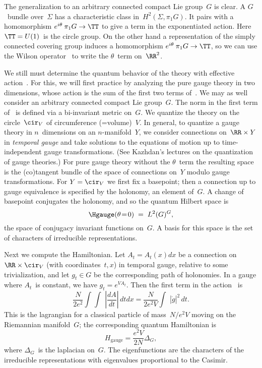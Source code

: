The generalization to an arbitrary connected compact Lie group~$G$ is clear.
A $G$~bundle over~$\Sigma $ has a characteristic class in~$H^2(\Sigma ,\pi
_1G)$.  It pairs with a homomorphism $e^{i\theta }\:\pi _1G\to\TT$ to give a
term in the exponentiated action.  Here $\TT=U(1)$~is the circle group.  On
the other hand a representation of the simply connected covering group
induces a homomorphism $e^{i\theta }\:\pi _1G\to\TT$, so we can use the
Wilson operator~ to write the $\theta $~term on~$\RR^2$. 

 We still must determine the quantum behavior of the theory with effective
action~.  For this, we will first practice by analyzing the pure
gauge theory in two dimensions, whose action is the sum of the first two
terms of~.  We may as well consider an arbitrary connected compact
Lie group~$G$.  The norm in the first term of~ is defined via a
bi-invariant metric on~$G$.  We quantize the theory on the circle~$\cir_V$ of
circumference (=volume)~$V$.  In general, to quantize a gauge theory in
$n$~dimensions on an $n$-manifold~$Y$, we consider connections on~$\RR\times
Y$ in {\it temporal gauge\/} and take solutions to the equations of motion up
to time-independent gauge transformations.  (See Kazhdan's lectures on the
quantization of gauge theories.)  For pure gauge theory without the $\theta
$~term the resulting space is the (co)tangent bundle of the space of
connections on~$Y$ modulo gauge transformations.  For $Y=\cir_V$ we first fix
a basepoint; then a connection up to gauge equivalence is specified by the
holonomy, an element of~$G$.  A change of basepoint conjugates the holonomy,
and so the quantum Hilbert space is
  $$ \Hgauge(\theta \!=\!0) \;=\; L^2(G)^G,  $$
the space of conjugacy invariant functions on~$G$.  A basis for this space is
the set of characters of irreducible representations. 
 
Next we compute the Hamiltonian.  Let $A_t=A_t(x)dx$ be a connection
on~$\RR\times \cir_V$ (with coordinates~$t,x$) in temporal gauge, relative to
some trivialization, and let $g_t\in G$ be the corresponding path of
holonomies.  In a gauge where $A_t$~is constant, we have $g_t=e^{VA_t}$.
Then the first term in the action~ is
  $$ \frac{N}{2e^2}\int_{}\int_{}\;\left| \frac{dA}{dt} \right| \,dtdx =
     \frac{N}{2e^2V}\int_{}\;|\dot{g}|^2\,dt. \tag{23} $$
This is the lagrangian for a classical particle of mass~$N/e^2V$ moving on
the Riemannian manifold~$G$; the corresponding quantum Hamiltonian is
  $$ H_{\text{gauge}} = \frac{e^2V}{2N}\Delta_G, \tag{24} $$
where $\Delta_G$~is the laplacian on~$G$.  The eigenfunctions are the
characters of the irreducible representations with eigenvalues proportional
to the Casimir.   
 
